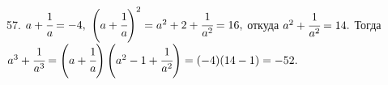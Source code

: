 57. $a+\cfrac{1}{a}=-4,\ \left(a+\cfrac{1}{a}\right)^2=a^2+2+\cfrac{1}{a^2}=16,$ откуда $a^2+\cfrac{1}{a^2}=14.$ Тогда\\ $a^3+\cfrac{1}{a^3}=
\left(a+\cfrac{1}{a}\right)\left(a^2-1+\cfrac{1}{a^2}\right)=(-4)(14-1)=-52.$\\
